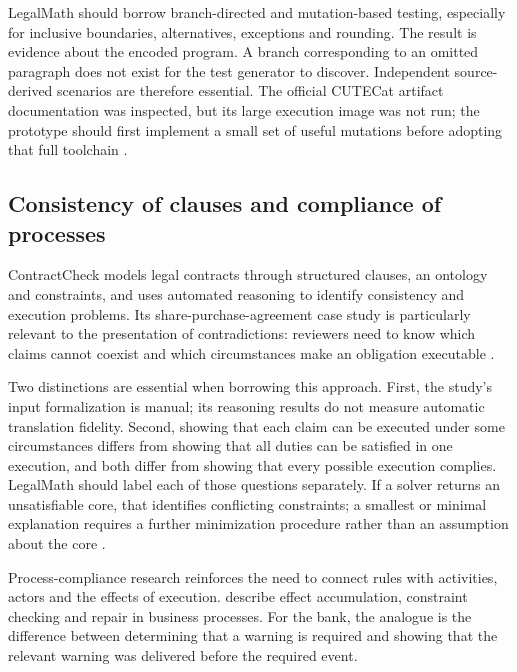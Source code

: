 \documentclass[12pt,a4paper,oneside,openany]{book}
\begin{document}
LegalMath should borrow branch-directed and mutation-based testing, especially
for inclusive boundaries, alternatives, exceptions and rounding. The result is
evidence about the encoded program. A branch corresponding to an omitted
paragraph does not exist for the test generator to discover. Independent
source-derived scenarios are therefore essential. The official CUTECat artifact
documentation was inspected, but its large execution image was not run; the
prototype should first implement a small set of useful mutations before adopting
that full toolchain \citep{libraryreview}.

\subsection{Consistency of clauses and compliance of processes}
\label{merge:P-02-literature:06}


ContractCheck models legal contracts through structured clauses, an ontology and
constraints, and uses automated reasoning to identify consistency and execution
problems. Its share-purchase-agreement case study is particularly relevant to
the presentation of contradictions: reviewers need to know which claims cannot
coexist and which circumstances make an obligation executable
\citep[secs.~3--7]{contractcheck2025}.

Two distinctions are essential when borrowing this approach. First, the study's
input formalization is manual; its reasoning results do not measure automatic
translation fidelity. Second, showing that each claim can be executed under
some circumstances differs from showing that all duties can be satisfied in one
execution, and both differ from showing that every possible execution complies.
LegalMath should label each of those questions separately. If a solver returns
an unsatisfiable core, that identifies conflicting constraints; a smallest or
minimal explanation requires a further minimization procedure rather than an
assumption about the core \citep[secs.~4--5, 8]{contractcheck2025}.

Process-compliance research reinforces the need to connect rules with activities,
actors and the effects of execution. \citet{ghose2007} describe effect accumulation,
constraint checking and repair in business processes. For the bank, the analogue
is the difference between determining that a warning is required and showing
that the relevant warning was delivered before the required event.
\end{document}
